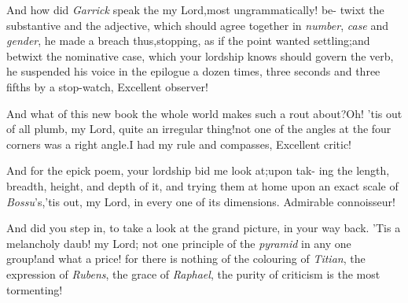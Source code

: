 \documentclass{article}
\begin{document}
\tsh And how did \textit{Garrick} speak the\break
{}\break
my Lord,\tsk most ungrammatically! be- twixt the substantive and the adjective, which
should agree together in \textit{number}, \textit{case} and \textit{gender}, he
made a breach thus,\tsk stopping, as if the point wanted
settling;\break\tsh and betwixt the nominative case, which your
lordship knows should go\-vern the verb, he suspended his voice\break
in the epilogue a dozen times, three\break
seconds and three fifths by a stop-watch,\break
{}
\tsh Excellent observer!

And what of this new book the whole world makes such a rout
about?\tsk Oh! ’tis out of all plumb, my Lord,\tsh\break
quite an irregular thing!\tsk not one of
the angles at the four corners was a right angle.\tsk I had my rule
and compasses,
\break
Excellent critic!

\tsh And for the epick poem, your\break
lordship bid me look at;\tsk upon tak-\break
ing the length, breadth, height, and\break
depth of it, and trying them at home\break
upon an exact scale of \textit{Bossu}’s,\tsh ’tis out,\break
my Lord, in every one of its dimensions.\break
\tsh Admirable connoisseur!

\tsh And did you step in, to take a look at the grand
picture, in your way back.\tsk\break
\tsh ’Tis a melancholy daub! my Lord;\break
not one principle of the \textit{pyramid} in any one
group!\tsh and what a price!\tsh\break
for there is nothing of
the colouring of \textit{Titian},\tsk
the expression of \textit{Rubens},\tsk
the grace of \textit{Raphael},\tsk
the purity of 
criticism is the most tormenting!
\end{document}
